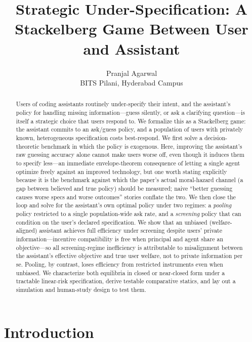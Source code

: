 \documentclass[11pt]{article}
\title{Strategic Under-Specification: A Stackelberg Game Between User and Assistant}
\author{Pranjal Agarwal \\ \small BITS Pilani, Hyderabad Campus}
\date{}
\begin{document}
\maketitle

\begin{abstract}
Users of coding assistants routinely under-specify their intent, and the assistant's
policy for handling missing information---guess silently, or ask a clarifying
question---is itself a strategic choice that users respond to. We formalize this as
a Stackelberg game: the assistant commits to an ask/guess policy, and a population
of users with privately known, heterogeneous specification costs best-respond. We
first solve a decision-theoretic benchmark in which the policy is exogenous. Here,
improving the assistant's raw guessing accuracy alone cannot make users worse
off, even though it induces them to specify less---an immediate envelope-theorem
consequence of letting a single agent optimize freely against an improved
technology, but one worth stating explicitly because it is the benchmark against
which the paper's actual moral-hazard channel (a gap between believed and true
policy) should be measured; naive ``better guessing causes worse specs and worse
outcomes'' stories conflate the two. We then
close the loop and solve for the assistant's own optimal policy under two regimes:
a \emph{pooling} policy restricted to a single population-wide ask rate, and a
\emph{screening} policy that can condition on the user's declared specification. We
show that an unbiased (welfare-aligned) assistant achieves full efficiency under
screening despite users' private information---incentive compatibility is free when
principal and agent share an objective---so all screening-regime inefficiency is
attributable to misalignment between the assistant's effective objective and true
user welfare, not to private information per se. Pooling, by contrast, loses
efficiency from restricted instruments even when unbiased. We characterize both
equilibria in closed or near-closed form under a tractable linear-risk
specification, derive testable comparative statics, and lay out a simulation and
human-study design to test them.
\end{abstract}

\section{Introduction}
\end{document}
